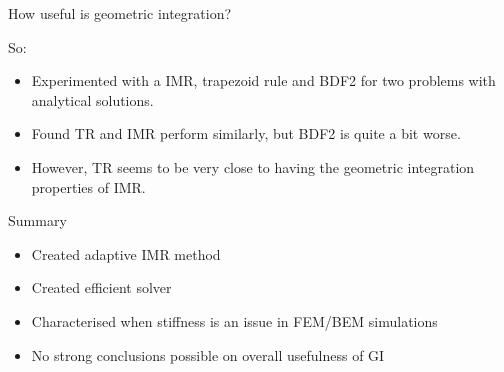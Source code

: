 \documentclass[18pt]{beamer}
\newlength{\wideitemsep}
\let\olditem\item
\renewcommand{\item}{\setlength{\itemsep}{\wideitemsep}\olditem}
\begin{document}
\begin{frame}{How useful is geometric integration?}

  So:
  \begin{itemize}
  \item Experimented with a IMR, trapezoid rule and BDF2 for two problems with
    analytical solutions.
  \item Found TR and IMR perform similarly, but BDF2 is quite a bit worse.
  \item However, TR seems to be very close to having the geometric
    integration properties of IMR.
  \end{itemize}

\end{frame}



\begin{frame}{Summary}
  \begin{itemize}
  \item Created adaptive IMR method
  \item Created efficient solver
  \item Characterised when stiffness is an issue in FEM/BEM simulations
  \item No strong conclusions possible on overall usefulness of GI
  \end{itemize}
\end{frame}
\end{document}
